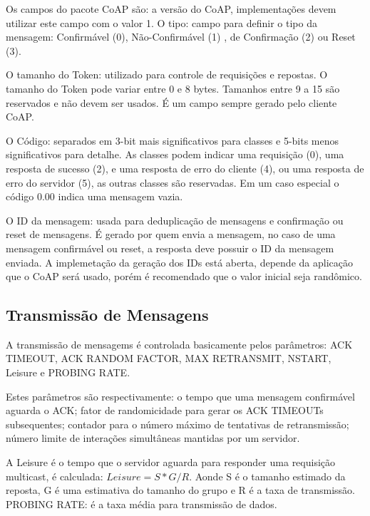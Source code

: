 Os campos do pacote CoAP s\~ao: a vers\~ao do CoAP, implementa\c{c}\~oes devem utilizar este campo com o valor 1. O tipo: campo para definir o tipo da mensagem: Confirm\'avel (0), N\~ao-Confirm\'avel (1) , de Confirma\c{c}\~ao (2) ou Reset (3).

O tamanho do Token: utilizado para controle de requisi\c{c}\~oes e repostas. O tamanho do Token pode variar entre 0 e 8 bytes. Tamanhos entre 9 a 15 s\~ao reservados e n\~ao devem ser usados. \'E um campo sempre gerado pelo cliente CoAP.

O C\'odigo: separados em 3-bit mais significativos para classes e 5-bits menos significativos para detalhe. As classes podem indicar uma requisi\c{c}\~ao (0), uma resposta de sucesso (2), e uma resposta de erro do cliente (4), ou uma resposta de erro do servidor (5), as outras classes s\~ao reservadas. Em um caso especial o c\'odigo 0.00 indica uma mensagem vazia.

O ID da mensagem: usada para deduplica\c{c}\~ao de mensagens e confirma\c{c}\~ao ou reset de mensagens. \'E gerado por quem envia a mensagem, no caso de uma mensagem confirm\'avel ou reset, a resposta deve possuir o ID da mensagem enviada. A implemeta\c{c}\~ao da gera\c{c}\~ao dos IDs est\'a aberta, depende da aplica\c{c}\~ao que o CoAP ser\'a usado, por\'em \'e recomendado que o valor inicial seja rand\^omico.
   
\subsection{Transmiss\~ao de Mensagens}
A transmiss\~ao de mensagems \'e controlada basicamente pelos par\^ametros: ACK TIMEOUT, ACK RANDOM FACTOR, MAX RETRANSMIT, NSTART, Leisure e PROBING RATE.

Estes par\^ametros s\~ao respectivamente: o tempo que uma mensagem confirm\'avel aguarda o ACK; fator de randomicidade para gerar os ACK TIMEOUTs subsequentes; contador para o n\'umero m\'aximo de tentativas de retransmiss\~ao; n\'umero limite de intera\c{c}\~oes simult\^aneas mantidas por um servidor.

A Leisure \'e o tempo que o servidor aguarda para responder uma requisi\c{c}\~ao multicast, \'e calculada: $Leisure = S * G / R$. Aonde S \'e o tamanho estimado da reposta, G \'e uma estimativa do tamanho do grupo e R \'e a taxa de transmiss\~ao. PROBING RATE: \'e a taxa m\'edia para transmiss\~ao de dados.

